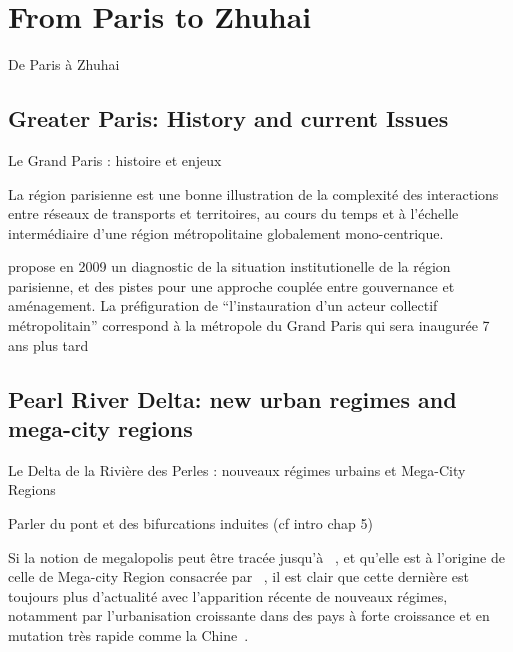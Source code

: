 




\section[From Paris to Zhuhai][De Paris à Zhuhai]{From Paris to Zhuhai}{De Paris à Zhuhai}

\label{sec:casestudies}







\subsection[Greater Paris][Grand Paris]{Greater Paris: History and current Issues}{Le Grand Paris : histoire et enjeux}


La région parisienne est une bonne illustration de la complexité des interactions entre réseaux de transports et territoires, au cours du temps et à l'échelle intermédiaire d'une région métropolitaine globalement mono-centrique.

\cite{gilli2009paris} propose en 2009 un diagnostic de la situation institutionelle de la région parisienne, et des pistes pour une approche couplée entre gouvernance et aménagement. La préfiguration de ``l'instauration d'un acteur collectif métropolitain'' correspond à la métropole du Grand Paris qui sera inaugurée 7 ans plus tard


\cite{Padeiro2012}





\subsection[Pearl River Delta][Le Delta de la Rivière des Perles]{Pearl River Delta: new urban regimes and mega-city regions}{Le Delta de la Rivière des Perles : nouveaux régimes urbains et Mega-City Regions}



Parler du pont et des bifurcations induites (cf intro chap 5)

Si la notion de megalopolis peut être tracée jusqu'à ~\cite{gottmann1964megalopolis}, et qu'elle est à l'origine de celle de Mega-city Region consacrée par ~\cite{hall2006polycentric}, il est clair que cette dernière est toujours plus d'actualité avec l'apparition récente de nouveaux régimes, notamment par l'urbanisation croissante dans des pays à forte croissance et en mutation très rapide comme la Chine~\cite{swerts2015megacities}.







